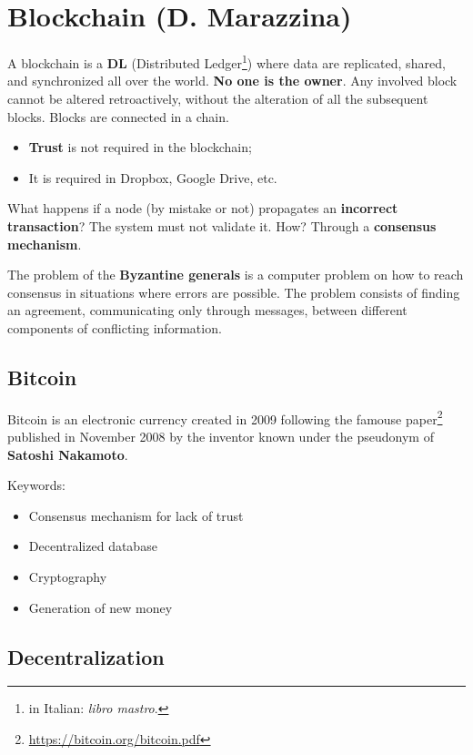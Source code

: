 
\chapter{Blockchain (D. Marazzina)}

A blockchain is a \textbf{DL} (Distributed Ledger\footnote{in Italian: \textit{libro mastro}.}) where data are replicated, shared, and synchronized all over the world. \textbf{No one is the owner}. Any involved block cannot be altered retroactively, without the alteration of all the subsequent blocks. Blocks are connected in a chain.
\begin{itemize}
	\item \textbf{Trust} is not required in the blockchain;
	\item It is required in Dropbox, Google Drive, etc.
\end{itemize}

What happens if a node (by mistake or not) propagates an \textbf{incorrect transaction}? The system must not validate it. How? Through a \textbf{consensus mechanism}.

The problem of the \textbf{Byzantine generals} is a computer problem on how to reach consensus in situations where errors are possible. The problem consists of finding an agreement, communicating only through messages, between different components of conflicting information.


\section{Bitcoin}

Bitcoin is an electronic currency created in 2009 following the famouse paper\footnote{\url{https://bitcoin.org/bitcoin.pdf}} published in November 2008 by the inventor known under the pseudonym of \textbf{Satoshi Nakamoto}.

Keywords:
\begin{itemize}
	\item Consensus mechanism for lack of trust
	\item Decentralized database
	\item Cryptography
	\item Generation of new money
\end{itemize}

\section{Decentralization}

